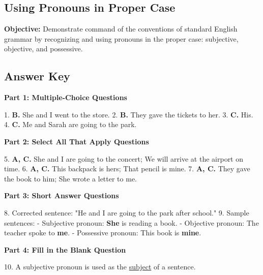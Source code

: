 \documentclass[12pt]{article}
\begin{document}
\subsection*{Using Pronouns in Proper Case}
\onehalfspacing

\begin{tcolorbox}[colframe=black!40, colback=gray!0, title=Learning Objective]
\textbf{Objective:} Demonstrate command of the conventions of standard English grammar by recognizing and using pronouns in the proper case: subjective, objective, and possessive.
\end{tcolorbox}

\subsection*{Answer Key}

\textbf{Part 1: Multiple-Choice Questions}

1. \textbf{B.} She and I went to the store.  
2. \textbf{B.} They gave the tickets to her.  
3. \textbf{C.} His.  
4. \textbf{C.} Me and Sarah are going to the park.  

\textbf{Part 2: Select All That Apply Questions}

5. \textbf{A, C.} She and I are going to the concert; We will arrive at the airport on time.  
6. \textbf{A, C.} This backpack is hers; That pencil is mine.  
7. \textbf{A, C.} They gave the book to him; She wrote a letter to me.  

\textbf{Part 3: Short Answer Questions}

8. Corrected sentence: "He and I are going to the park after school."  
9. Sample sentences:
   - Subjective pronoun: \textbf{She} is reading a book.  
   - Objective pronoun: The teacher spoke to \textbf{me}.  
   - Possessive pronoun: This book is \textbf{mine}.  

\textbf{Part 4: Fill in the Blank Question}

10. A subjective pronoun is used as the \underline{subject} of a sentence.
\end{document}
